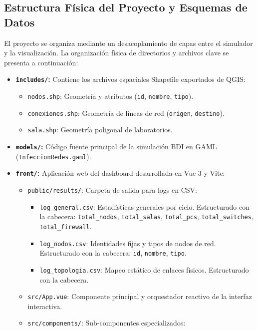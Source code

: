 \subsection{Estructura Física del Proyecto y Esquemas de Datos}
El proyecto se organiza mediante un desacoplamiento de capas entre el simulador y la visualización. La organización física de directorios y archivos clave se presenta a continuación:
\begin{itemize}
    \item \textbf{\texttt{includes/}:} Contiene los archivos espaciales Shapefile exportados de QGIS:
    \begin{itemize}
        \item \texttt{nodos.shp}: Geometría y atributos (\texttt{id}, \texttt{nombre}, \texttt{tipo}).
        \item \texttt{conexiones.shp}: Geometría de líneas de red (\texttt{origen}, \texttt{destino}).
        \item \texttt{sala.shp}: Geometría poligonal de laboratorios.
    \end{itemize}
    \item \textbf{\texttt{models/}:} Código fuente principal de la simulación BDI en GAML (\texttt{Infeccion\allowbreak Redes.\allowbreak gaml}).
    \item \textbf{\texttt{front/}:} Aplicación web del dashboard desarrollada en Vue 3 y Vite:
    \begin{itemize}
        \item \texttt{public/results/}: Carpeta de salida para logs en CSV:
        \begin{itemize}
            \item \texttt{log\_general.csv}: Estadísticas generales por ciclo. Estructurado con la cabecera: \texttt{total\_nodos}, \texttt{total\_salas}, \texttt{total\_pcs}, \texttt{total\_switches}, \texttt{total\_firewall}.
            \item \texttt{log\_nodos.csv}: Identidades fijas y tipos de nodos de red. Estructurado con la cabecera: \texttt{id}, \texttt{nombre}, \texttt{tipo}.
            \item \texttt{log\_topologia.csv}: Mapeo estático de enlaces físicos. Estructurado con la cabecera.
        \end{itemize}
        \item \texttt{src/App.vue}: Componente principal y orquestador reactivo de la interfaz interactiva.
        \item \texttt{src/components/}: Sub-componentes especializados:

\end{itemize}
\end{itemize}
